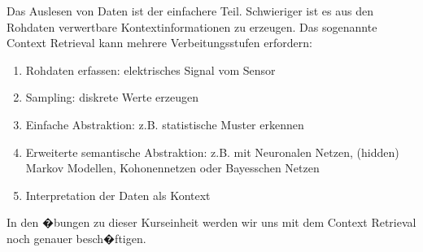 Das Auslesen von Daten ist der einfachere Teil. Schwieriger ist es aus den Rohdaten verwertbare Kontextinformationen zu erzeugen. Das sogenannte Context Retrieval kann mehrere Verbeitungsstufen erfordern:
\begin{enumerate}
\item Rohdaten erfassen: elektrisches Signal vom Sensor
\item Sampling: diskrete Werte erzeugen  
\item Einfache Abstraktion: z.B. statistische Muster erkennen 
\item Erweiterte semantische Abstraktion: z.B. mit Neuronalen Netzen, (hidden) Markov Modellen, Kohonennetzen oder Bayesschen Netzen 
\item Interpretation der Daten als Kontext
\end{enumerate}
In den �bungen zu dieser Kurseinheit werden wir uns mit dem Context Retrieval noch genauer besch�ftigen. 


\begin{comment}
yyy Kamera:

Physical hyperlinking (mobile tagging)
Visual codes for camera phones
Image recognition
Optical movement detection
Target acquisition with camera phones

Taking snapshot of surroundings
  Camera phones
  Additional data input channel
  1D / 2D barcodes
  Bridging different media types
  Paper and electronic media, mobile devices and electronic displays
  Linking mobile devices
  Authentication between devices via the visual channel
  Overlaying information onto the real world
  Augmented reality
  Creating input devices
  Optical movement detection
  Server-based image recognition
  Server analyzes uploaded image

  Linking the physical to the virtual world
  The environment as part of the interface
  Integration with the users activities
  Camera phones as bridging devices
  Always available imaging device
  Continuous wireless connectivity
  Processing power enables on-device
image processing
  Display and audio capabilities
  Handheld camera vs. fixed camera
  Traditionally predominantly fixed cameras

Digital cameras: Sources of rich sensor data
  Interpretable by humans and machines
  Can be processed in many ways
  Issues of perceptual interfaces (computer vision,
gesture recognition, speech recognition)
  Potential for recognition errors
  Impact on user experience depends on application
  Issues of camera-based interfaces
 
 
Recognition errors
Delay for processing (responsiveness)
Dependence on lighting conditions
Needs a lot of computational resources


Reality Browsers: Wikitude

\end{comment}


